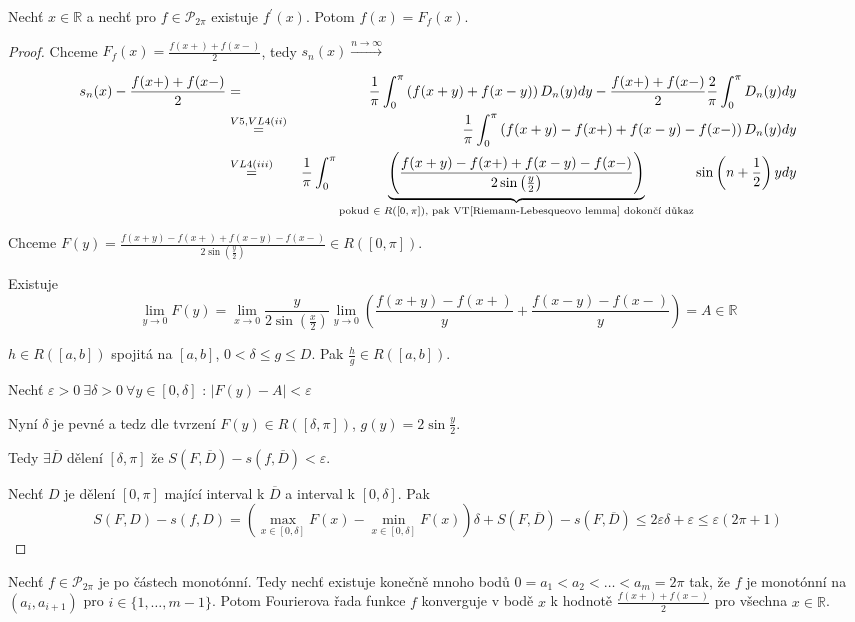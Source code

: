 \begin{dusledek}
Nechť $x \in \mathbb{R}$ a nechť pro $f \in \mathcal{P}_{2 \pi}$ existuje $f^\prime (x)$. Potom $f(x)=F_f(x)$.
\end{dusledek}

\begin{proof}
Chceme $F_f(x) = \frac{f(x+) + f(x-)}{2}$, tedy $s_n(x) \overset{n \rightarrow \infty}{\rightarrow}$

\begin{eqnarray*}
s_n(x) - \frac{f(x+)+f(x-)}{2} & = & \frac{1}{\pi} \int_0^\pi \left( f(x+y) + f(x-y) \right) D_n(y) dy - \frac{f(x+) + f(x-)}{2} \frac{2}{\pi} \int_0^\pi D_n(y)dy \\
& \overset{V5, VL4 (ii)}{=} & \frac{1}{\pi} \int_0^\pi \left( f(x+y) - f(x+) + f(x-y) - f(x-) \right) D_n(y) dy \\
& \overset{VL4(iii)}{=} & \frac{1}{\pi} \int_{0}^\pi \underbrace{\left( \frac{f(x+y) - f(x+) + f(x-y) - f(x-)}{2 \sin \left( \frac{y}{2} \right)} \right)}_{\textrm{pokud $\in R([0,\pi])$, pak VT\ref{Riemann-Lebesqueovo lemma} dokončí důkaz}} \sin \left( n + \frac{1}{2} \right)y dy 
\end{eqnarray*}

Chceme $F(y) = \frac{f(x+y) - f(x+) + f(x-y) - f(x-)}{2 \sin \left( \frac{y}{2} \right)} \in R([0,\pi])$. 

Existuje
$$\lim_{y \rightarrow 0} F(y) = \lim_{x \rightarrow 0} \frac{y}{2 \sin \left( \frac{x}{2} \right)} \lim_{y \rightarrow 0} \left( \frac{f(x+y)-f(x+)}{y} + \frac{f(x-y)-f(x-)}{y} \right) = A \in \mathbb{R}$$

\begin{tvrzeni}
$h \in R([a,b])$ spojitá na $[a,b]$, $0 < \delta \leq g \leq D$. Pak $\frac{h}{g} \in R([a,b])$.
\end{tvrzeni}

Nechť $\varepsilon > 0 \ \exists \delta > 0 \ \forall y \in [0, \delta] \textrm{ : } |F(y)-A| < \varepsilon$

Nyní $\delta$ je pevné a tedz dle tvrzení $F(y) \in R([\delta, \pi])$, $g(y) = 2 \sin \frac{y}{2}$.

Tedy $\exists \overline{D}$ dělení $[\delta, \pi]$ že $S(F,\overline{D}) - s(f,\overline{D}) < \varepsilon$.

Nechť $D$ je dělení $[0,\pi]$ mající interval k $\overline{D}$ a interval k $[0, \delta]$. Pak 
$$S(F, D)-s(f,D) = \left( \max_{x \in [0, \delta]} F(x) - \min_{x \in [0, \delta]} F(x) \right) \delta + S(F, \overline{D}) - s(F, \overline{D}) \leq 2 \varepsilon \delta + \varepsilon \leq \varepsilon (2 \pi + 1)$$
\end{proof}

\begin{vetabd}
Nechť $f \in \mathcal{P}_{2\pi}$ je po částech monotónní. Tedy nechť existuje konečně mnoho bodů $0=a_1 < a_2 < \ldots < a_m = 2 \pi$ tak, že $f$ je monotónní na $(a_i, a_{i+1})$ pro $i \in \{1, \ldots, m-1 \}$. Potom Fourierova řada funkce $f$ konverguje v bodě $x$ k hodnotě $\frac{f(x+) + f(x-)}{2}$ pro všechna $x \in \mathbb{R}$.
\end{vetabd}